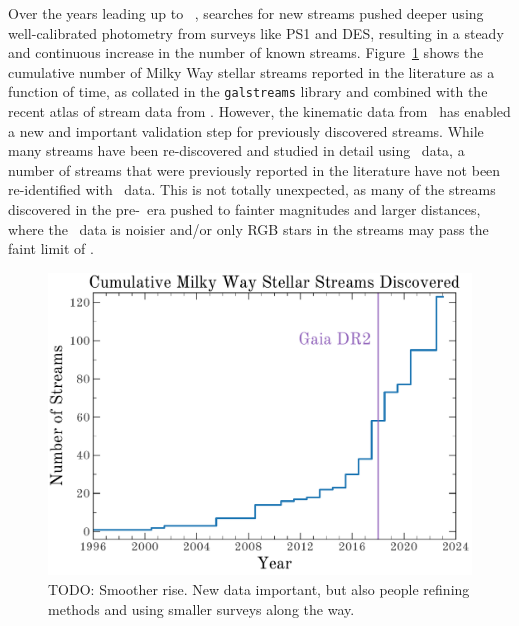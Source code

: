 \documentclass[final,5p,times,twocolumn,authoryear]{elsarticle}
\begin{document}
Over the years leading up to \gaia\ , searches for new streams pushed deeper using
well-calibrated photometry from surveys like PS1 and DES, resulting in a steady and
continuous increase in the number of known streams.
Figure~\ref{fig:num-streams} shows the cumulative number of Milky Way stellar streams
reported in the literature as a function of time, as collated in the \texttt{galstreams}
\citep{mateu:2023} library and combined with the recent atlas of stream data from
\citet{ibata:2024}.
However, the kinematic data from \gaia\ has enabled a new and important validation step
for previously discovered streams.
While many streams have been re-discovered and studied in detail using \gaia\ data, a
number of streams that were previously reported in the literature have not been
re-identified with \gaia\ data.
This is not totally unexpected, as many of the streams discovered in the pre-\gaia\ era
pushed to fainter magnitudes and larger distances, where the \gaia\ data is noisier
and/or only RGB stars in the streams may pass the faint limit of \gaia.

\begin{figure}[t!]
    \begin{center}
    \includegraphics[width=\columnwidth]{cumulative-num-streams.pdf}
    \end{center}
    \caption{%
    TODO: Smoother rise. New data important, but also people refining methods and using smaller surveys along the way.
    \label{fig:num-streams}
    }
\end{figure}
\end{document}
